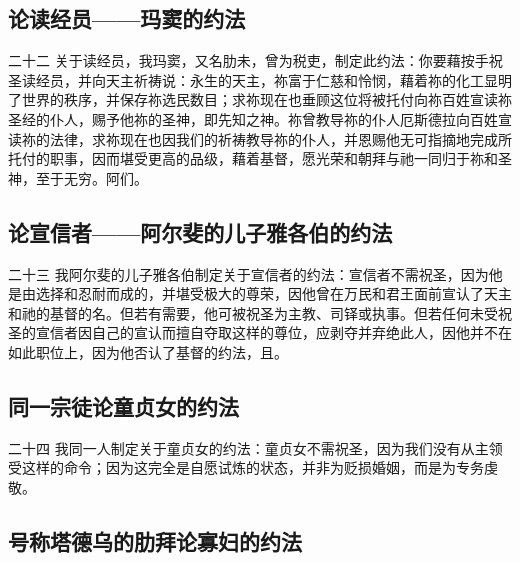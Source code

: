 
\subsection{论读经员——玛窦的约法}

二十二 关于读经员，我玛窦，又名肋未，曾为税吏，制定此约法：你要藉按手祝圣读经员，并向天主祈祷说：永生的天主，祢富于仁慈和怜悯，藉着祢的化工显明了世界的秩序，并保存祢选民数目；求祢现在也垂顾这位将被托付向祢百姓宣读祢圣经的仆人，赐予他祢的圣神，即先知之神。祢曾教导祢的仆人厄斯德拉向百姓宣读祢的法律，求祢现在也因我们的祈祷教导祢的仆人，并恩赐他无可指摘地完成所托付的职事，因而堪受更高的品级，藉着基督，愿光荣和朝拜与祂一同归于祢和圣神，至于无穷。阿们。\par


\subsection{论宣信者——阿尔斐的儿子雅各伯的约法}

二十三 我阿尔斐的儿子雅各伯制定关于宣信者的约法：宣信者不需祝圣，因为他是由选择和忍耐而成的，并堪受极大的尊荣，因他曾在万民和君王面前宣认了天主和祂的基督的名。但若有需要，他可被祝圣为主教、司铎或执事。但若任何未受祝圣的宣信者因自己的宣认而擅自夺取这样的尊位，应剥夺并弃绝此人，因他并不在如此职位上，因为他否认了基督的约法，且。\par


\subsection{同一宗徒论童贞女的约法}

二十四 我同一人制定关于童贞女的约法：童贞女不需祝圣，因为我们没有从主领受这样的命令；因为这完全是自愿试炼的状态，并非为贬损婚姻，而是为专务虔敬。\par


\subsection{号称塔德乌的肋拜论寡妇的约法}

